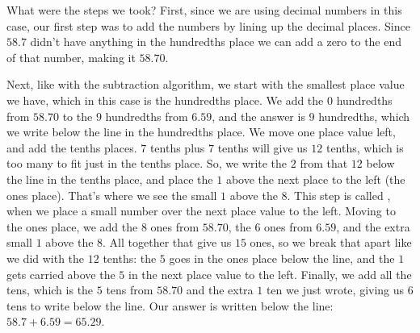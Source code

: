 \documentclass{ximera}
\begin{document}
\begin{image}  \end{image}

What were the steps we took? First, since we are using decimal numbers in this case, our first step was to add the numbers by lining up the decimal places. Since $58.7$ didn't have anything in the hundredths place we can add a zero to the end of that number, making it $58.70$.

Next, like with the subtraction algorithm, we start with the smallest place value we have, which in this case is the hundredths place. We add the $0$ hundredths from $58.70$ to the $9$ hundredths from $6.59$, and the answer is $9$ hundredths, which we write below the line in the hundredths place. We move one place value left, and add the tenths places. $7$ tenths plus $7$ tenths will give us $12$ tenths, which is too many to fit just in the tenths place. So, we write the $2$ from that $12$ below the line in the tenths place, and place the $1$ above the next place to the left (the ones place). That's where we see the small $1$ above the $8$. This step is called , when we place a small number over the next place value to the left. Moving to the ones place, we add the $8$ ones from $58.70$, the $6$ ones from $6.59$, and the extra small $1$ above the $8$. All together that give us $15$ ones, so we break that apart like we did with the $12$ tenths: the $5$ goes in the ones place below the line, and the $1$ gets carried above the $5$ in the next place value to the left. Finally, we add all the tens, which is the $5$ tens from $58.70$ and the extra $1$ ten we just wrote, giving us $6$ tens to write below the line. Our answer is written below the line: $58.7+6.59=65.29$.
\end{document}
